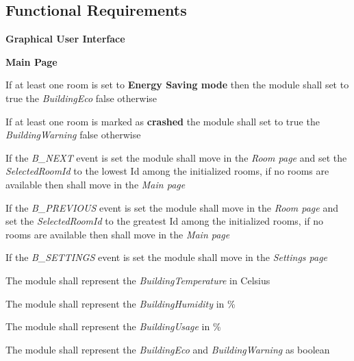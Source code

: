	\subsection{Functional Requirements}
		\begin{req_enum}
			\item \textbf{Graphical User Interface}
			\begin{req_enum}[label*=\arabic*.]
					\item \textbf{Main Page}
						\begin{req_enum}[label*=\arabic*.]
							\item If at least one room is set to \textbf{Energy Saving mode} then the module shall set to true the \textit{BuildingEco} false otherwise \\
							\item If at least one room is marked as \textbf{crashed} the module shall set to true the \textit{BuildingWarning} false otherwise \\

							\item If the \textit{B\_NEXT} event is set the module shall move in the \textit{Room page} and set the \textit{SelectedRoomId} to the lowest Id among the initialized rooms, if no rooms are available then shall move in the \textit{Main page} \\
							\item If the \textit{B\_PREVIOUS} event is set the module shall move in the \textit{Room page} and set the \textit{SelectedRoomId} to the greatest Id among the initialized rooms, if no rooms are available then shall move in the \textit{Main page} \\
							\item If the \textit{B\_SETTINGS} event is set the module shall move in the \textit{Settings page} \\

							\item The module shall represent the \textit{BuildingTemperature} in Celsius\degree \\
							\item The module shall represent the \textit{BuildingHumidity} in \% \\
							\item The module shall represent the \textit{BuildingUsage} in \% \\
							\item The module shall represent the \textit{BuildingEco} and \textit{BuildingWarning} as boolean \\
						\end{req_enum}


\end{req_enum}
\end{req_enum}
